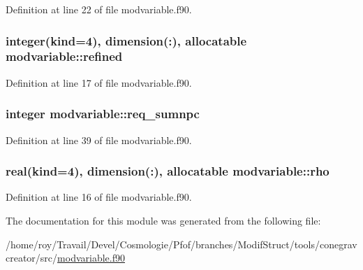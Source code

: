 Definition at line 22 of file modvariable.\-f90.

\hypertarget{classmodvariable_a8de6519433943eabe03c631fdab15e67}{
\subsubsection[{refined}]{\setlength{\rightskip}{0pt plus 5cm}integer(kind=4), dimension(\-:), allocatable modvariable\-::refined}}\label{classmodvariable_a8de6519433943eabe03c631fdab15e67}


Definition at line 17 of file modvariable.\-f90.

\hypertarget{classmodvariable_adfc8585ffcde6504507af946c0afbea8}{
\subsubsection[{req\-\_\-sumnpc}]{\setlength{\rightskip}{0pt plus 5cm}integer modvariable\-::req\-\_\-sumnpc}}\label{classmodvariable_adfc8585ffcde6504507af946c0afbea8}


Definition at line 39 of file modvariable.\-f90.

\hypertarget{classmodvariable_a29eaedbfcc5873ff326af3c93e5558c6}{
\subsubsection[{rho}]{\setlength{\rightskip}{0pt plus 5cm}real(kind=4), dimension(\-:), allocatable modvariable\-::rho}}\label{classmodvariable_a29eaedbfcc5873ff326af3c93e5558c6}


Definition at line 16 of file modvariable.\-f90.



The documentation for this module was generated from the following file\-:\begin{DoxyCompactItemize}
\item 
/home/roy/\-Travail/\-Devel/\-Cosmologie/\-Pfof/branches/\-Modif\-Struct/tools/conegravcreator/src/\hyperlink{modvariable_8f90}{modvariable.\-f90}\end{DoxyCompactItemize}

